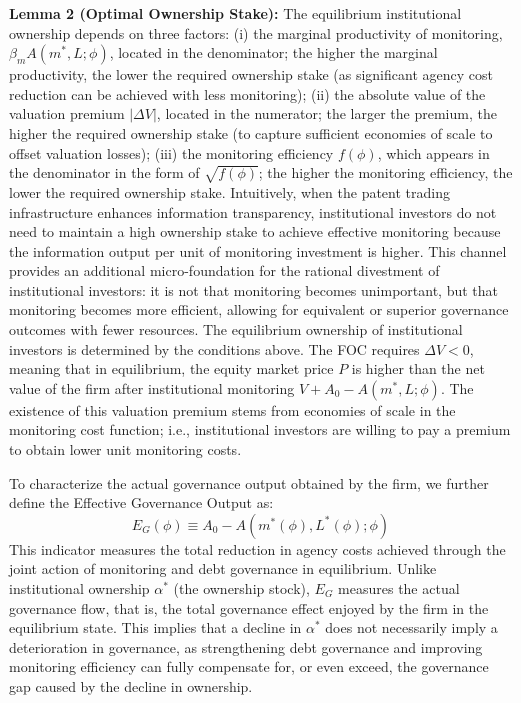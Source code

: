 \documentclass[12pt,a4paper]{article}
\begin{document}
\textbf{Lemma 2 (Optimal Ownership Stake):} The equilibrium institutional ownership depends on three factors: (i) the marginal productivity of monitoring, $\beta_m A(m^*, L; \phi)$, located in the denominator; the higher the marginal productivity, the lower the required ownership stake (as significant agency cost reduction can be achieved with less monitoring); (ii) the absolute value of the valuation premium $|\Delta V|$, located in the numerator; the larger the premium, the higher the required ownership stake (to capture sufficient economies of scale to offset valuation losses); (iii) the monitoring efficiency $f(\phi)$, which appears in the denominator in the form of $\sqrt{f(\phi)}$; the higher the monitoring efficiency, the lower the required ownership stake. Intuitively, when the patent trading infrastructure enhances information transparency, institutional investors do not need to maintain a high ownership stake to achieve effective monitoring because the information output per unit of monitoring investment is higher. This channel provides an additional micro-foundation for the rational divestment of institutional investors: it is not that monitoring becomes unimportant, but that monitoring becomes more efficient, allowing for equivalent or superior governance outcomes with fewer resources. The equilibrium ownership of institutional investors is determined by the conditions above. The FOC requires $\Delta V < 0$, meaning that in equilibrium, the equity market price $P$ is higher than the net value of the firm after institutional monitoring $V + A_0 - A(m^*, L; \phi)$. The existence of this valuation premium stems from economies of scale in the monitoring cost function; i.e., institutional investors are willing to pay a premium to obtain lower unit monitoring costs.

To characterize the actual governance output obtained by the firm, we further define the Effective Governance Output as:
\begin{equation}
E_G(\phi) \equiv A_0 - A(m^*(\phi), L^*(\phi); \phi)
\end{equation}
This indicator measures the total reduction in agency costs achieved through the joint action of monitoring and debt governance in equilibrium. Unlike institutional ownership $\alpha^*$ (the ownership stock), $E_G$ measures the actual governance flow, that is, the total governance effect enjoyed by the firm in the equilibrium state. This implies that a decline in $\alpha^*$ does not necessarily imply a deterioration in governance, as strengthening debt governance and improving monitoring efficiency can fully compensate for, or even exceed, the governance gap caused by the decline in ownership.
\end{document}
